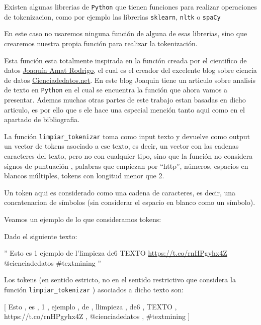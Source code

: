 \documentclass[
  11pt,
  a4paper,
]{article}
\begin{document}
Existen algunas librerias de \texttt{Python} que tienen funciones para
realizar operaciones de tokenizacion, como por ejemplo las librerias
\texttt{sklearn}, \texttt{nltk} o \texttt{spaCy}

En este caso no usaremos ninguna función de alguna de esas librerias,
sino que crearemos nuestra propia función para realizar la tokenización.

Esta función esta totalmente inspirada en la función creada por el
cientifico de datos \href{}{Joaquín Amat Rodrigo}, el cual es el creador
del excelente blog sobre ciencia de datos
\href{https://www.cienciadedatos.net/}{Cienciadedatos.net}. En este blog
Joaquin tiene un articulo sobre analisis de texto en \texttt{Python} en
el cual se encuentra la función que ahora vamos a presentar. Ademas
muchas otras partes de este trabajo estan basadas en dicho articulo, es
por ello que s ele hace una especial mención tanto aqui como en el
apartado de bibliografia.

La función \texttt{limpiar\_tokenizar} toma como input texto y devuelve
como output un vector de tokens asociado a ese texto, es decir, un
vector con las cadenas caracteres del texto, pero no con cualquier tipo,
sino que la función no considera signos de puntuación , palabras que
empiezan por ``http'', números, espacios en blancos múltiples, tokens
con longitud menor que 2.

Un token aqui es considerado como una cadena de caracteres, es decir,
una concatenacion de símbolos (sin considerar el espacio en blanco como
un símbolo).

Veamos un ejemplo de lo que consideramos tokens:

Dado el siguiente texto:

'' Esto es 1 ejemplo de l'limpieza de6 TEXTO
\url{https://t.co/rnHPgyhx4Z} @cienciadedatos \#textmining ''

Los tokens (en sentido estricto, no en el sentido restrictivo que
considera la función \texttt{limpiar\_tokenizar} ) asociados a dicho
texto son:

{[} Esto , es , 1 , ejemplo , de , l\textquotesingle limpieza , de6 ,
TEXTO , https://t.co/rnHPgyhx4Z , @cienciadedatos , \#textmining {]}
\end{document}
